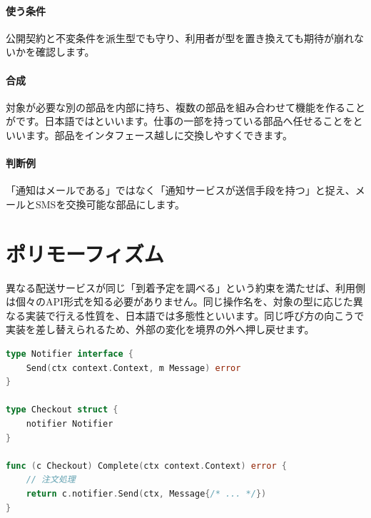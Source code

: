 \paragraph{使う条件}
        公開契約と不変条件を派生型でも守り、利用者が型を置き換えても期待が崩れないかを確認します。

\par
\endgroup
\medskip
\begingroup
\paragraph{合成}
        対象が必要な別の部品を内部に持ち、複数の部品を組み合わせて機能を作ることがです。日本語ではといいます。仕事の一部を持っている部品へ任せることをといいます。部品をインタフェース越しに交換しやすくできます。

\paragraph{判断例}
        「通知はメールである」ではなく「通知サービスが送信手段を持つ」と捉え、メールとSMSを交換可能な部品にします。

\par
\endgroup
\par
\endgroup


\section{ポリモーフィズム}
\label{sec:04-software-engineering-14}

異なる配送サービスが同じ「到着予定を調べる」という約束を満たせば、利用側は個々のAPI形式を知る必要がありません。同じ操作名を、対象の型に応じた異なる実装で行える性質を、日本語では多態性といいます。同じ呼び方の向こうで実装を差し替えられるため、外部の変化を境界の外へ押し戻せます。

\begingroup
\begingroup
      \begin{lstlisting}[language=Go]
type Notifier interface {
    Send(ctx context.Context, m Message) error
}

type Checkout struct {
    notifier Notifier
}

func (c Checkout) Complete(ctx context.Context) error {
    // 注文処理
    return c.notifier.Send(ctx, Message{/* ... */})
}
      \end{lstlisting}
\par
\endgroup
\medskip
\begingroup
